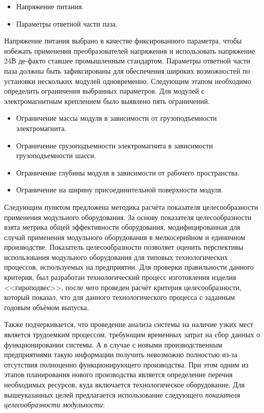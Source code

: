 \begin{itemize}
	\item Напряжение питания.
	\item Параметры ответной части паза.
\end{itemize}

Напряжение питания выбрано в качестве фиксированного параметра, чтобы избежать применения преобразователей напряжения и использовать напряжение 24\:В де-факто ставшее промышленным стандартом. Параметры ответной части паза должны быть зафиксированы для обеспечения  широких возможностей по установки нескольких модулей одновременно. Следующим этапом необходимо определить ограничения выбранных параметров. Для модулей с электромагнитным креплением было выявлено пять ограничений.

\begin{itemize}
	\item Ограничение массы модуля в зависимости от грузоподъемности электромагнита.
	\item Ограничение грузоподъемности электромагнита в зависимости грузоподъемности шасси.
	\item Ограничение глубины модуля в зависимости от рабочего пространства.
	\item Ограничение на ширину присоединительной поверхности модуля.
\end{itemize}

Следующим пунктом предложена методика расчёта показателя целесообразности применения модульного оборудования. За основу показателя целесообразности взята метрика общей эффективности оборудования, модифицированная для случай применения модульного оборудования в мелкосерийном и единичном производстве. Показатель целесообразности позволяет оценить перспективы использования модульного оборудования для типовых технологических процессов, используемых на предприятии. Для проверки правильности данного критерия, был разработан технологический процесс изготовления изделия <<гироподвес>>, после чего проведен расчёт критерия целесообразности, который показал, что для данного технологического процесса с заданным годовым объёмом выпуска. 

Также подчеркивается, что проведение анализа системы на наличие узких мест является трудоемким процессом, требующим временных затрат на сбор данных о функционировании системы. А в случае с новыми производственным предприятиями такую информации получить невозможно полностью из-за отсутствия полноценно функционирующего производства. При этом одним из этапов планирования нового производства является определение перечня необходимых ресурсов, куда включается технологическое оборудование. Для вышеуказанных целей предлагается использование следующего \textit{показателя целесообразности модульности}:

